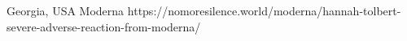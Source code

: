           {Georgia, USA}
          {}
          {Moderna}
          {}
          {
          }
          {https://nomoresilence.world/moderna/hannah-tolbert-severe-adverse-reaction-from-moderna/}
